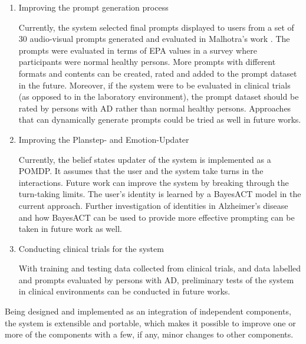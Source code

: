\begin{enumerate}
\item{Improving the prompt generation process}

Currently, the system selected final prompts displayed to users from a set of 30 audio-visual prompts generated and evaluated in Malhotra's work \cite{malhotra2014}. The prompts were evaluated in terms of EPA values in a survey where participants were normal healthy persons. More prompts with different formats and contents can be created, rated and added to the prompt dataset in the future. Moreover, if the system were to be evaluated in clinical trials (as opposed to in the laboratory environment), the prompt dataset should be rated by persons with AD rather than normal healthy persons. Approaches that can dynamically generate prompts could be tried as well in future works.

\item{Improving the Planstep- and Emotion-Updater}

Currently, the belief states updater of the system is implemented as a POMDP. It assumes that the user and the system take turns in the interactions. Future work can improve the system by breaking through the turn-taking limits. The user's identity is learned by a BayesACT model in the current approach. Further investigation of identities in Alzheimer's disease and how BayesACT can be used to provide more effective prompting can be taken in future work as well.

\item{Conducting clinical trials for the system}

With training and testing data collected from clinical trials, and data labelled and prompts evaluated by persons with AD, preliminary tests of the system in clinical environments can be conducted in future works.

\end{enumerate}

Being designed and implemented as an integration of independent components, the system is extensible and portable, which makes it possible to improve one or more of the components with a few, if any, minor changes to other components.

